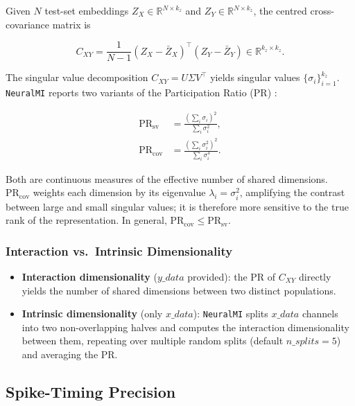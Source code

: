 \documentclass[12pt]{article}
\newcommand{\nmi}{\texttt{NeuralMI}}
\newcommand{\R}{\mathbb{R}}
\begin{document}
Given $N$ test-set embeddings $Z_X \in \R^{N\times k_z}$ and
$Z_Y \in \R^{N\times k_z}$, the centred cross-covariance matrix is

\begin{equation}
  C_{XY} = \frac{1}{N-1}(Z_X - \bar{Z}_X)^\top(Z_Y - \bar{Z}_Y)
  \in \R^{k_z\times k_z}.
  \label{eq:crosscov}
\end{equation}

The singular value decomposition $C_{XY} = U\Sigma V^\top$ yields singular
values $\{\sigma_i\}_{i=1}^{k_z}$.  \nmi{} reports two variants of the
Participation Ratio (PR) \citep{gulati2026mutual}:

\begin{align}
  \mathrm{PR}_{\mathrm{sv}}
  &= \frac{\left(\sum_i \sigma_i\right)^2}{\sum_i \sigma_i^2},
  \label{eq:pr_sv}\\[4pt]
  \mathrm{PR}_{\mathrm{cov}}
  &= \frac{\left(\sum_i \sigma_i^2\right)^2}{\sum_i \sigma_i^4}.
  \label{eq:pr_cov}
\end{align}

Both are continuous measures of the effective number of shared dimensions.
$\mathrm{PR}_{\mathrm{cov}}$ weights each dimension by its eigenvalue
$\lambda_i = \sigma_i^2$, amplifying the contrast between large and small
singular values; it is therefore more sensitive to the true rank of the
representation.  In general, $\mathrm{PR}_{\mathrm{cov}} \le
\mathrm{PR}_{\mathrm{sv}}$.

\subsubsection{Interaction vs.\ Intrinsic Dimensionality}

\begin{itemize}[leftmargin=*]
  \item \textbf{Interaction dimensionality} ($y\_data$ provided): the PR of
        $C_{XY}$ directly yields the number of shared dimensions between two
        distinct populations.
  \item \textbf{Intrinsic dimensionality} (only $x\_data$): \nmi{} splits
        $x\_data$ channels into two non-overlapping halves and computes the
        interaction dimensionality between them, repeating over multiple random
        splits (default $n\_splits=5$) and averaging the PR.
\end{itemize}

\subsection{Spike-Timing Precision}
\label{sec:theory:precision}
\end{document}
